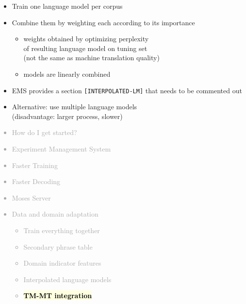 \documentclass[landscape]{uedslides2C}
\newcommand{\currenttopic}[1]{\colorbox{lightyellow}{\textcolor{black}{\bf #1}}}
\begin{document}

\vspace{5mm}
\begin{itemize} \itemsep 5mm
\item Train one language model per corpus
\item Combine them by weighting each according to its importance
\begin{itemize}
\item weights obtained by optimizing perplexity\\ of resulting language model on tuning set\\
(not the same as machine translation quality) \vspace{2mm}
\item models are linearly combined
\end{itemize}
\item EMS provides a section {\tt [INTERPOLATED-LM]} that needs to be commented out
\item Alternative: use multiple language models\\
(disadvantage: larger process, slower)
\end{itemize}


\vspace{-5mm}
\textcolor{darkgrey}{
\begin{itemize} \itemsep -1mm
\item {How do I get started?}
\item {Experiment Management System}
\item {Faster Training}
\item {Faster Decoding}
\item {Moses Server}
\item {Data and domain adaptation}
  \begin{itemize} \vspace{-5mm}
  \item {Train everything together}
  \item {Secondary phrase table}
  \item Domain indicator features
\item Interpolated language models
  \item \currenttopic{TM-MT integration}
  \end{itemize}
\end{itemize}
}
\end{document}
